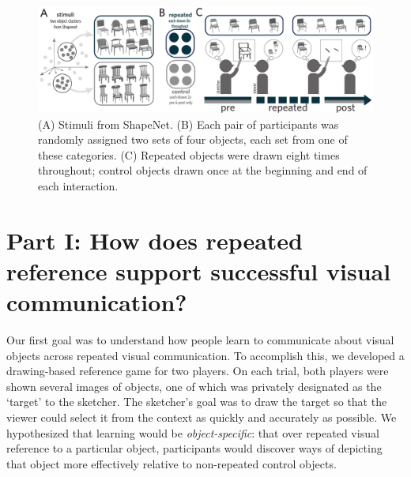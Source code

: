 \documentclass[10pt,letterpaper]{article}
\begin{document}
\begin{figure}
\begin{center}
\includegraphics[width=0.95\linewidth]{figures/task_stimuli.pdf}
\caption{(A) Stimuli from ShapeNet. (B) Each pair of participants was randomly assigned two sets of four objects, each set from one of these categories. (C) Repeated objects were drawn eight times throughout; control objects drawn once at the beginning and end of each interaction.}
\label{task_stimuli}
\vspace{-1em}
\end{center}
\end{figure}

\section{Part I: How does repeated reference support successful visual communication?}

Our first goal was to understand how people learn to communicate about visual objects across repeated visual communication.
To accomplish this, we developed a drawing-based reference game for two players.
On each trial, both players were shown several images of objects, one of which was privately designated as the `target' to the sketcher.
The sketcher's goal was to draw the target so that the viewer could select it from the context as quickly and accurately as possible.
We hypothesized that learning would be \emph{object-specific}: that over repeated visual reference to a particular object, participants would discover ways of depicting that object more effectively relative to non-repeated control objects.

\end{document}
